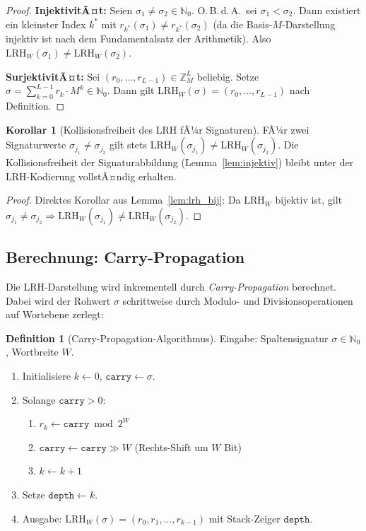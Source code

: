 ﻿\documentclass[a4paper,12pt]{article}
\theoremstyle{definition}
\newtheorem{definition}{Definition}
\newtheorem{korollar}{Korollar}
\begin{document}
\begin{proof}
\textbf{InjektivitÃ¤t:} Seien $\sigma_1 \neq \sigma_2 \in \mathbb{N}_0$.
O.\,B.\,d.\,A.\ sei $\sigma_1 < \sigma_2$. Dann existiert ein kleinster Index $k^*$ mit
$r_{k^*}(\sigma_1) \neq r_{k^*}(\sigma_2)$ (da die Basis-$M$-Darstellung injektiv ist
nach dem Fundamentalsatz der Arithmetik). Also
$\mathrm{LRH}_W(\sigma_1) \neq \mathrm{LRH}_W(\sigma_2)$.

\textbf{SurjektivitÃ¤t:} Sei $(r_0, \ldots, r_{L-1}) \in \mathbb{Z}_M^L$ beliebig.
Setze $\sigma = \sum_{k=0}^{L-1} r_k \cdot M^k \in \mathbb{N}_0$.
Dann gilt $\mathrm{LRH}_W(\sigma) = (r_0, \ldots, r_{L-1})$ nach Definition.
\end{proof}

\begin{korollar}[Kollisionsfreiheit des LRH fÃ¼r Signaturen]
\label{kor:lrh_kollfrei}
FÃ¼r zwei Signaturwerte $\sigma_{j_1} \neq \sigma_{j_2}$ gilt stets
$\mathrm{LRH}_W(\sigma_{j_1}) \neq \mathrm{LRH}_W(\sigma_{j_2})$.
Die Kollisionsfreiheit der Signaturabbildung (Lemma~\ref{lem:injektiv}) bleibt
unter der LRH-Kodierung vollstÃ¤ndig erhalten.
\end{korollar}

\begin{proof}
Direktes Korollar aus Lemma~\ref{lem:lrh_bij}: Da $\mathrm{LRH}_W$ bijektiv ist,
gilt $\sigma_{j_1} \neq \sigma_{j_2} \Rightarrow \mathrm{LRH}_W(\sigma_{j_1}) \neq
\mathrm{LRH}_W(\sigma_{j_2})$.
\end{proof}

\subsection{Berechnung: Carry-Propagation}

Die LRH-Darstellung wird inkrementell durch \emph{Carry-Propagation} berechnet.
Dabei wird der Rohwert $\sigma$ schrittweise durch Modulo- und Divisionsoperationen
auf Wortebene zerlegt:

\begin{definition}[Carry-Propagation-Algorithmus]
\label{def:carry}
Eingabe: Spaltensignatur $\sigma \in \mathbb{N}_0$, Wortbreite $W$.
\begin{enumerate}
  \item Initialisiere $k \leftarrow 0$, $\mathtt{carry} \leftarrow \sigma$.
  \item Solange $\mathtt{carry} > 0$:
    \begin{enumerate}
      \item $r_k \leftarrow \mathtt{carry} \bmod 2^W$
      \item $\mathtt{carry} \leftarrow \mathtt{carry} \gg W$ \quad (Rechts-Shift um $W$ Bit)
      \item $k \leftarrow k + 1$
    \end{enumerate}
  \item Setze $\mathtt{depth} \leftarrow k$.
  \item Ausgabe: $\mathrm{LRH}_W(\sigma) = (r_0, r_1, \ldots, r_{k-1})$ mit Stack-Zeiger
        $\mathtt{depth}$.
\end{enumerate}
\end{definition}
\end{document}
